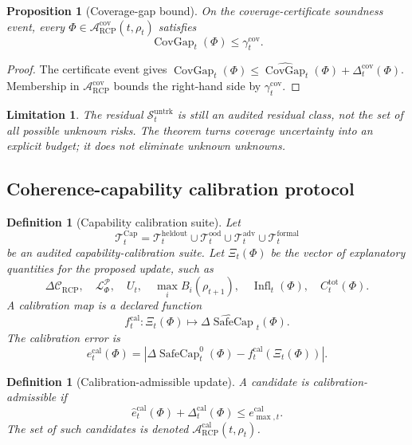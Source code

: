 \documentclass[11pt]{article}
\newtheorem{proposition}[theorem]{Proposition}
\newtheorem{definition}[theorem]{Definition}
\newtheorem{limitation}[theorem]{Limitation}
\newcommand{\Acal}{\mathcal{A}}
\newcommand{\Pcal}{\mathcal{P}}
\newcommand{\Ccal}{\mathcal{C}}
\newcommand{\Lcal}{\mathcal{L}}
\newcommand{\1}{\mathbf{1}}
\newcommand{\RCP}{\mathrm{RCP}}
\renewcommand{\Cap}{\operatorname{Cap}}
\providecommand{\Scal}{\mathcal{S}}
\providecommand{\Tcal}{\mathcal{T}}
\providecommand{\SafeCap}{\operatorname{SafeCap}}
\begin{document}
\begin{proposition}[Coverage-gap bound]
\label{prop:coverage_gap_bound_operational}
On the coverage-certificate soundness event, every \(\Phi\in\Acal_{\RCP}^{\mathrm{cov}}(t,\rho_t)\) satisfies
\[
\operatorname{CovGap}_t(\Phi)\le\gamma_t^{\mathrm{cov}}.
\]
\end{proposition}

\begin{proof}
The certificate event gives \(\operatorname{CovGap}_t(\Phi)\le \widehat{\operatorname{CovGap}}_t(\Phi)+\Delta_t^{\mathrm{cov}}(\Phi)\).  Membership in \(\Acal_{\RCP}^{\mathrm{cov}}\) bounds the right-hand side by \(\gamma_t^{\mathrm{cov}}\).
\end{proof}

\begin{limitation}
The residual \(\Scal_t^{\mathrm{untrk}}\) is still an audited residual class, not the set of all possible unknown risks.  The theorem turns coverage uncertainty into an explicit budget; it does not eliminate unknown unknowns.
\end{limitation}

\subsection{Coherence-capability calibration protocol}

\begin{definition}[Capability calibration suite]
\label{def:capability_calibration_suite_operational}
Let
\[
\Tcal_t^{\Cap}
=
\Tcal_t^{\mathrm{heldout}}
\cup
\Tcal_t^{\mathrm{ood}}
\cup
\Tcal_t^{\mathrm{adv}}
\cup
\Tcal_t^{\mathrm{formal}}
\]
be an audited capability-calibration suite.  Let \(\Xi_t(\Phi)\) be the vector of explanatory quantities for the proposed update, such as
\[
\Delta\Ccal_{\RCP},\quad
\Lcal_{\Phi}^{\Pcal},\quad
U_t,\quad
\max_i B_i(\rho_{t+1}),\quad
\operatorname{Infl}_t(\Phi),\quad
C_t^{\mathrm{tot}}(\Phi).
\]
A calibration map is a declared function
\[
f_t^{\mathrm{cal}}:\Xi_t(\Phi)\mapsto \widehat{\Delta\SafeCap}_t(\Phi).
\]
The calibration error is
\[
e_t^{\mathrm{cal}}(\Phi)
=
\left|
\Delta\SafeCap_t^0(\Phi)-f_t^{\mathrm{cal}}(\Xi_t(\Phi))
\right|.
\]
\end{definition}

\begin{definition}[Calibration-admissible update]
\label{def:calibration_admissible_update_operational}
A candidate is calibration-admissible if
\[
\widehat e_t^{\mathrm{cal}}(\Phi)+\Delta_t^{\mathrm{cal}}(\Phi)
\le
 e_{\max,t}^{\mathrm{cal}}.
\]
The set of such candidates is denoted \(\Acal_{\RCP}^{\mathrm{cal}}(t,\rho_t)\).
\end{definition}
\end{document}

